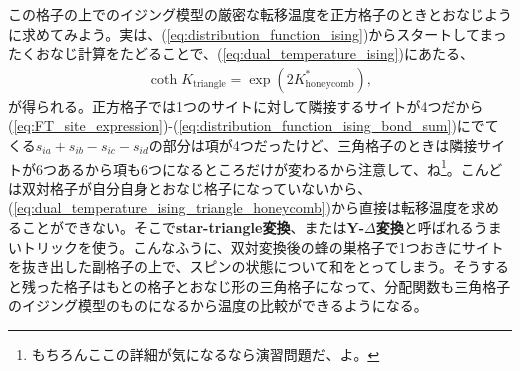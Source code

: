 \documentclass[paper=b5j,fontsize=12Q,jafontsize=12Q,baselineskip=21Q]{jlreq}
\begin{document}
\begin{refsection}
この格子の上でのイジング模型の厳密な転移温度を正方格子のときとおなじように求めてみよう。実は、(\ref{eq:distribution_function_ising})からスタートしてまったくおなじ計算をたどることで、(\ref{eq:dual_temperature_ising})にあたる、
\begin{align}
  \coth K_{\mathrm{triangle}}=\exp\left(2K^\ast_{\mathrm{honeycomb}}\right),\label{eq:dual_temperature_ising_triangle_honeycomb}
\end{align}
が得られる。正方格子では1つのサイトに対して隣接するサイトが4つだから(\ref{eq:FT_site_expression})-(\ref{eq:distribution_function_ising_bond_sum})にでてくる$s_{ia}+s_{ib}-s_{ic}-s_{id}$の部分は項が4つだったけど、三角格子のときは隣接サイトが6つあるから項も6つになるところだけが変わるから注意して、ね\footnote{もちろんここの詳細が気になるなら演習問題だ、よ。}。こんどは双対格子が自分自身とおなじ格子になっていないから、(\ref{eq:dual_temperature_ising_triangle_honeycomb})から直接は転移温度を求めることができない。そこで\textbf{star-triangle変換}、または\textbf{Y-$\Delta$変換}と呼ばれるうまいトリックを使う。こんなふうに、双対変換後の蜂の巣格子で1つおきにサイトを抜き出した副格子の上で、スピンの状態について和をとってしまう。そうすると残った格子はもとの格子とおなじ形の三角格子になって、分配関数も三角格子のイジング模型のものになるから温度の比較ができるようになる。

\begin{center}
\end{center}
\end{refsection}
\end{document}
